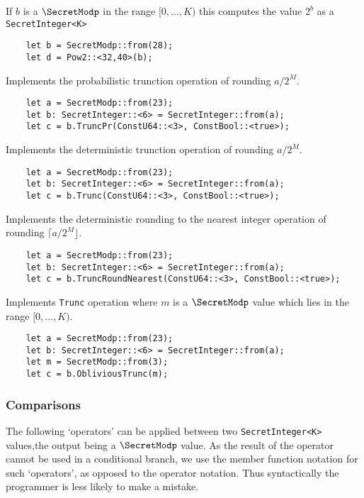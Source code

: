 If $b$ is a $\SecretModp$ in the range $[0,\ldots,K)$ this computes
the value $2^b$ as a \verb|SecretInteger<K>|
\begin{lstlisting}
    let b = SecretModp::from(28);
    let d = Pow2::<32,40>(b);
\end{lstlisting}

Implements the probabilistic trunction operation of rounding $a/2^M$.
\begin{lstlisting}
    let a = SecretModp::from(23);
    let b: SecretInteger::<6> = SecretInteger::from(a);
    let c = b.TruncPr(ConstU64::<3>, ConstBool::<true>);
\end{lstlisting}

Implements the deterministic trunction operation of rounding $a/2^M$.
\begin{lstlisting}
    let a = SecretModp::from(23);
    let b: SecretInteger::<6> = SecretInteger::from(a);
    let c = b.Trunc(ConstU64::<3>, ConstBool::<true>);
\end{lstlisting}

Implements the deterministic rounding to the nearest integer operation
of rounding $\lceil a/2^M \rfloor$.
\begin{lstlisting}
    let a = SecretModp::from(23);
    let b: SecretInteger::<6> = SecretInteger::from(a);
    let c = b.TruncRoundNearest(ConstU64::<3>, ConstBool::<true>);
\end{lstlisting}

Implements \verb|Trunc| operation where $m$ is a $\SecretModp$ value
which lies in the range $[0,\ldots,K)$.
\begin{lstlisting}
    let a = SecretModp::from(23);
    let b: SecretInteger::<6> = SecretInteger::from(a);
    let m = SecretModp::from(3);
    let c = b.ObliviousTrunc(m);
\end{lstlisting}

\subsubsection{Comparisons}
The following `operators' can be applied between two \verb|SecretInteger<K>| 
values,the output being a $\SecretModp$ value.
As the result of the operator cannot be used in a conditional branch,
we use the member function notation for such `operators', as opposed
to the operator notation. Thus syntactically the programmer is less
likely to make a mistake.

